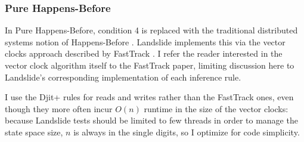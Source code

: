 
\subsubsection{Pure Happens-Before}
\label{sec:landslide-phb}

In Pure Happens-Before,
condition 4 is replaced with the traditional distributed systems notion of Happens-Before \cite{lamport-clocks}.
Landslide implements this via the vector clocks approach described by {\sc FastTrack} \cite{fasttrack}.
I refer the reader interested in the vector clock algorithm itself to the {\sc FastTrack} paper,
limiting discussion here to Landslide's corresponding implementation of each inference rule.

I use the {\sc Djit+} rules for reads and writes rather than the {\sc FastTrack} ones,
even though they more often incur $O(n)$ runtime in the size of the vector clocks:
because Landslide tests should be limited to few threads in order to manage the state space size,
$n$ is always in the single digits, so I optimize for code simplicity.

